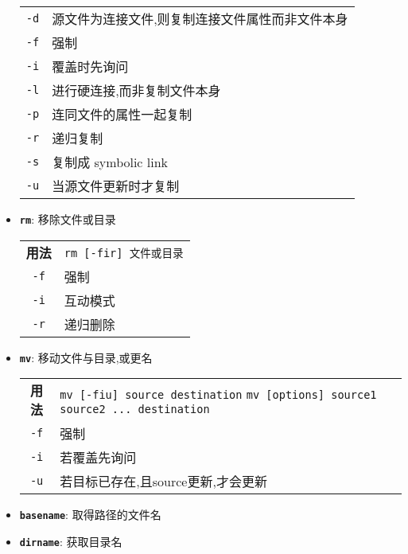 \begin{itemize}
\begin{longtable}{c@{: }p{}}
     \texttt{-d}  &  源文件为连接文件,则复制连接文件属性而非文件本身  \\

    \texttt{-f} & 强制 \\

    \texttt{-i} & 覆盖时先询问 \\

    \texttt{-l} & 进行硬连接,而非复制文件本身 \\

    \texttt{-p} & 连同文件的属性一起复制 \\

    \texttt{-r} & 递归复制 \\

   \texttt{-s} & 复制成 symbolic link \\

    \texttt{-u} & 当源文件更新时才复制 \\

    \hline
  \end{longtable}

\item \textbf{\texttt{rm}}: 移除文件或目录
  \begin{longtable}{c@{: }p{}}\hline\hline

    \textbf{用法} & \verb"rm [-fir] 文件或目录"
    \\

    \texttt{-f} & 强制  \\

     \texttt{-i}  &  互动模式  \\

    \texttt{-r} & 递归删除 \\

    \hline
  \end{longtable}

\item \textbf{\texttt{mv}}: 移动文件与目录,或更名
  \begin{longtable}{c@{: }p{}}\hline\hline

    \textbf{用法} & \verb"mv [-fiu] source destination" \newline
                    \verb"mv [options] source1 source2 ... destination"
    \\

    \texttt{-f} & 强制  \\

     \texttt{-i}  &  若覆盖先询问  \\

    \texttt{-u} & 若目标已存在,且source更新,才会更新 \\

    \hline
  \end{longtable}

\item \textbf{\texttt{basename}}: 取得路径的文件名

\item \textbf{\texttt{dirname}}: 获取目录名

\end{itemize}

